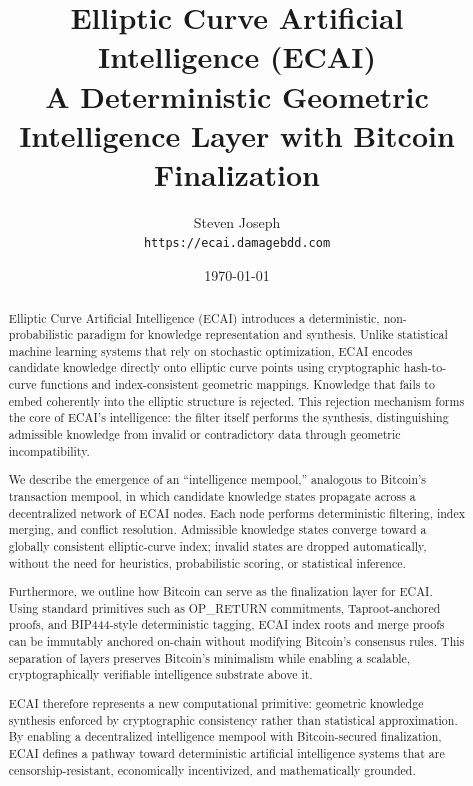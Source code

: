 \documentclass[11pt]{article}
\title{%
\Huge \textbf{Elliptic Curve Artificial Intelligence (ECAI)}\\[0.4cm]
\Large A Deterministic Geometric Intelligence Layer with Bitcoin Finalization
}
\author{%
Steven Joseph \\
\texttt{https://ecai.damagebdd.com}
}
\date{\today}
\begin{document}
\maketitle

\begin{abstract}
Elliptic Curve Artificial Intelligence (ECAI) introduces a deterministic, non-probabilistic paradigm for knowledge representation and synthesis. Unlike statistical machine learning systems that rely on stochastic optimization, ECAI encodes candidate knowledge directly onto elliptic curve points using cryptographic hash-to-curve functions and index-consistent geometric mappings. Knowledge that fails to embed coherently into the elliptic structure is rejected. This rejection mechanism forms the core of ECAI's intelligence: the filter itself performs the synthesis, distinguishing admissible knowledge from invalid or contradictory data through geometric incompatibility.

We describe the emergence of an ``intelligence mempool,'' analogous to Bitcoin's transaction mempool, in which candidate knowledge states propagate across a decentralized network of ECAI nodes. Each node performs deterministic filtering, index merging, and conflict resolution. Admissible knowledge states converge toward a globally consistent elliptic-curve index; invalid states are dropped automatically, without the need for heuristics, probabilistic scoring, or statistical inference.

Furthermore, we outline how Bitcoin can serve as the finalization layer for ECAI. Using standard primitives such as OP\_RETURN commitments, Taproot-anchored proofs, and BIP444-style deterministic tagging, ECAI index roots and merge proofs can be immutably anchored on-chain without modifying Bitcoin's consensus rules. This separation of layers preserves Bitcoin's minimalism while enabling a scalable, cryptographically verifiable intelligence substrate above it.

ECAI therefore represents a new computational primitive: geometric knowledge synthesis enforced by cryptographic consistency rather than statistical approximation. By enabling a decentralized intelligence mempool with Bitcoin-secured finalization, ECAI defines a pathway toward deterministic artificial intelligence systems that are censorship-resistant, economically incentivized, and mathematically grounded.
\end{abstract}

\newpage

\tableofcontents
\newpage
\end{document}
